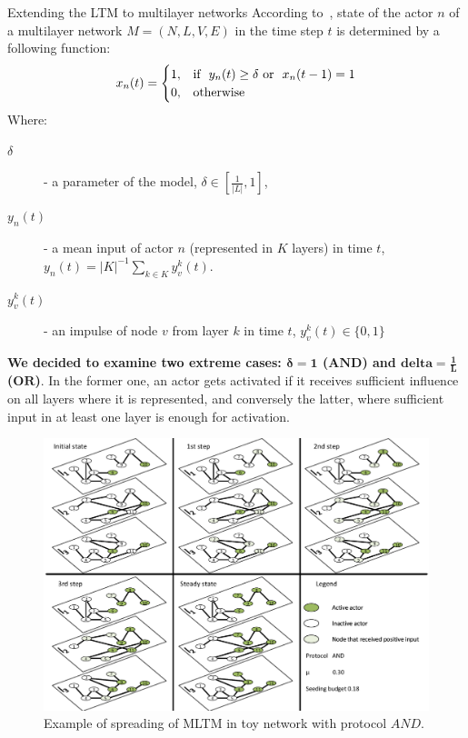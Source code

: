 \documentclass[final]{beamer}
\newlength{\colwidth}
\begin{document}
\begin{frame}[t, fragile]
\begin{columns}[t]
\begin{column}{\colwidth}
\begin{alertblock}{Extending the LTM to multilayer networks}
    \label{def:proto}
        According to~\cite{zhong2022mltm}, state of the actor $n$ of a multilayer network $M = (N, L, V, E)$ in the time step $t$ is determined
        by a following function: 
        \begin{equation*}
            x_{n}(t) =
            \begin{cases}
              1,  & \text{if \space} y_{n}(t) \geq \delta \text{\space or 
                \space} x_{n}(t-1) = 1 \\
              0,  & \text{otherwise}
            \end{cases} 
        \end{equation*}
        Where:
        \begin{description}
            \item[$\delta$] - a parameter of the model, $\delta \in [\frac{1}{|L|}, 1]$,
            \item[$y_{n}(t)$] - a mean input of actor $n$ (represented in $K$ layers) in time $t$, $y_{n}(t) = |K|^{-1} \sum_{k \in K} y_{v}^{k}(t)$.
            \item[$y_{v}^{k}(t)$] - an impulse of node $v$ from layer $k$ in time $t$, $y_{v}^{k}(t) \in \{0, 1\}$
        \end{description}

    \textbf{We decided to examine two extreme cases: $\mathbf{\delta = 1}$ ($\mathbf{AND}$) and $\mathbf{delta = \frac{1}{L}}$ ($\mathbf{OR}$)}. In the former one, an actor gets activated if it receives sufficient influence on all layers where it is represented, and conversely the latter, where sufficient input in at least one layer is enough for activation.
    \begin{figure}
        \centering
        \includegraphics[width=1\linewidth]{figures/ltm_example.pdf}
        \caption{Example of spreading of MLTM in toy network with protocol $AND$.}
        \label{fig:ltm_example_and}
    \end{figure}
\end{alertblock}


\end{column}
\end{columns}
\end{frame}
\end{document}
